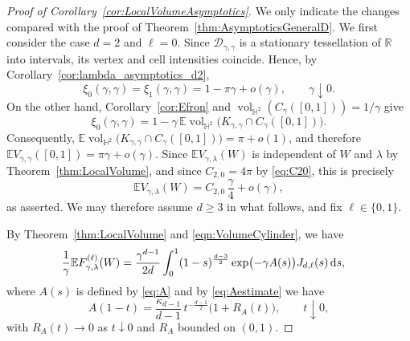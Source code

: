 \documentclass[11pt,a4paper]{article}
\theoremstyle{plain}
\theoremstyle{definition}
\theoremstyle{remark}
\newcommand{\dint}{\textup{d}}
\newcommand{\vol}{\mathop{\mathrm{vol}}\nolimits}
\def\EE{\mathbb{E}}
\def\HH{\mathbb{H}}
\def\RR{\mathbb{R}}
\def\cD{\mathcal{D}}
\begin{document}
\begin{proof}[Proof of Corollary~\ref{cor:LocalVolumeAsymptotics}]
	We only indicate the changes compared with the proof of
	Theorem~\ref{thm:AsymptoticsGeneralD}.
	We first consider the case \(d=2\) and \(\ell=0\). Since
	\(\cD_{\gamma,\gamma}\) is a stationary tessellation of \(\RR\) into
	intervals, its vertex and cell intensities coincide. Hence, by
	Corollary~\ref{cor:lambda_asymptotics_d2},
	\[
		\xi_0(\gamma,\gamma)
		=
		\xi_1(\gamma,\gamma)
		=
		1-\pi\gamma+o(\gamma),
		\qquad \gamma\downarrow0.
	\]
	On the other hand, Corollary~\ref{cor:Efron} and
	\(\vol_{\HH^2}(C_\gamma([0,1]))=1/\gamma\) give
	\[
		\xi_0(\gamma,\gamma)
		=
		1-\gamma\,
		\EE\vol_{\HH^2}\bigl(
		K_{\gamma,\gamma}\cap C_\gamma([0,1])
		\bigr).
	\]
	Consequently, $\EE\vol_{\HH^2}\bigl(
		K_{\gamma,\gamma}\cap C_\gamma([0,1])
		\bigr)=\pi+o(1)$,
	and therefore $\EE V_{\gamma,\gamma}([0,1])=\pi\gamma+o(\gamma)$.
	Since \(\EE V_{\gamma,\lambda}(W)\) is independent of \(W\) and
	\(\lambda\) by Theorem~\ref{thm:LocalVolume}, and since
	\(C_{2,0}=4\pi\) by \eqref{eq:C20}, this is precisely
	\[
		\EE V_{\gamma,\lambda}(W)
		=
		C_{2,0}\,
		\frac{\gamma}{4}
		+
		o(\gamma),
	\]
	as asserted. We may therefore assume \(d\ge3\) in what follows, and fix \(\ell\in\{0,1\}\).

	By Theorem~\ref{thm:LocalVolume} and
	\eqref{eqn:VolumeCylinder}, we have
	\begin{align}
		\frac{1}{\gamma}\EE F_{\gamma,\lambda}^{(\ell)}(W)
		 & =
		\frac{\gamma^{d-1}}{2d}
		\int_0^1
		(1-s)^{\frac{d-3}{2}}
		\exp\bigl(-\gamma A(s)\bigr)
		J_{d,\ell}(s)\,\dint s,
		\label{eq:LocalFunctionalAsymptotics}
	\end{align}
	where $A(s)$ is defined by \eqref{eq:A} and by  \eqref{eq:Aestimate} we have
	\[
		A(1-t)
		=
		\frac{\kappa_{d-1}}{d-1}\,
		t^{-\frac{d-1}{2}}\big(1 + R_A(t)\big),
		\qquad t\downarrow0,
	\]
	with $R_A(t) \to 0$ as $t \downarrow 0$ and $R_A$ bounded on $(0,1)$.


\end{proof}
\end{document}
